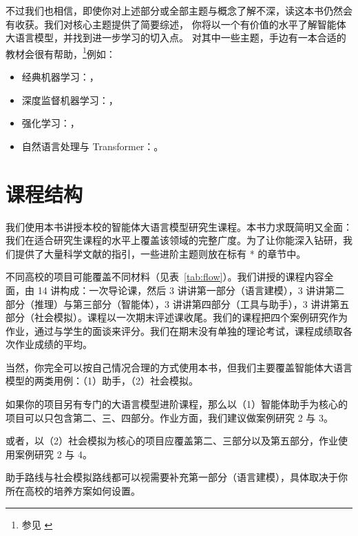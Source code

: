 不过我们也相信，即使你对上述部分或全部主题与概念了解不深，读这本书仍然会有收获。我们对核心主题提供了简要综述，%
你将以一个有价值的水平了解智能体大语言模型，并找到进一步学习的切入点。
对其中一些主题，手边有一本合适的教材会很有帮助，\footnote{参见 \citet{gunasekar2024textbooks}}例如：
\begin{itemize}
    \item 
经典机器学习：\citet{alpaydin2021machine,flach2012machine}，
\item 深度监督机器学习：\citet{bishop2023deep,goodfellow2016deep,chollet2021deep,stevens2020deep}，
\item 强化学习：\citet{sutton2018reinforcement,graesser2019foundations,plaat2022deep,franccois2018introduction}，
\item 自然语言处理与 Transformer：\citet{jm3}。
\end{itemize}


\section{课程结构}
我们使用本书讲授本校的智能体大语言模型研究生课程。本书力求既简明又全面：我们在适合研究生课程的水平上覆盖该领域的完整广度。为了让你能深入钻研，我们提供了大量科学文献的指引，一些进阶主题则放在标有 * 的章节中。

不同高校的项目可能覆盖不同材料（见表~\ref{tab:flow}）。我们讲授的课程内容全面，由 14 讲构成：一次导论课，然后 3 讲讲第一部分（语言建模），3 讲讲第二部分（推理）与第三部分（智能体），3 讲讲第四部分（工具与助手），3 讲讲第五部分（社会模拟）。课程以一次期末评述课收尾。我们的课程把四个案例研究作为作业，通过与学生的面谈来评分。我们在期末没有单独的理论考试，课程成绩取各次作业成绩的平均。

当然，你完全可以按自己情况合理的方式使用本书，但我们主要覆盖智能体大语言模型的两类用例：（1）助手，（2）社会模拟。

如果你的项目另有专门的大语言模型进阶课程，那么以（1）智能体助手为核心的项目可以只包含第二、三、四部分。作业方面，我们建议做案例研究 2 与 3。

或者，以（2）社会模拟为核心的项目应覆盖第二、三部分以及第五部分，作业使用案例研究 2 与 4。

助手路线与社会模拟路线都可以视需要补充第一部分（语言建模），具体取决于你所在高校的培养方案如何设置。

